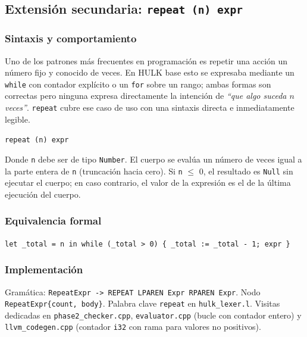 \documentclass[11pt,a4paper]{article}
\begin{document}
\subsection{Extensión secundaria: \texttt{repeat (n) expr}}

\subsubsection{Sintaxis y comportamiento}

Uno de los patrones más frecuentes en programación es repetir una acción un número fijo y conocido de veces. En HULK base esto se expresaba mediante un \texttt{while} con contador explícito o un \texttt{for} sobre un rango; ambas formas son correctas pero ninguna expresa directamente la intención de \emph{``que algo suceda $n$ veces''}. \texttt{repeat} cubre ese caso de uso con una sintaxis directa e inmediatamente legible.

\begin{center}
\texttt{repeat (n) expr}
\end{center}

Donde \texttt{n} debe ser de tipo \texttt{Number}. El cuerpo se evalúa un número de veces igual a la parte entera de \texttt{n} (truncación hacia cero). Si \texttt{n} $\leq$ 0, el resultado es \texttt{Null} sin ejecutar el cuerpo; en caso contrario, el valor de la expresión es el de la última ejecución del cuerpo.

\subsubsection{Equivalencia formal}

\begin{center}
\small
\texttt{let \_total = n in while (\_total > 0) \{ \_total := \_total - 1; expr \}}
\end{center}

\subsubsection{Implementación}

Gramática: \texttt{RepeatExpr -> REPEAT LPAREN Expr RPAREN Expr}. Nodo \texttt{RepeatExpr\{count, body\}}. Palabra clave \texttt{repeat} en \texttt{hulk\_lexer.l}. Visitas dedicadas en \texttt{phase2\_checker.cpp}, \texttt{evaluator.cpp} (bucle con contador entero) y \texttt{llvm\_codegen.cpp} (contador \texttt{i32} con rama para valores no positivos).
\end{document}
